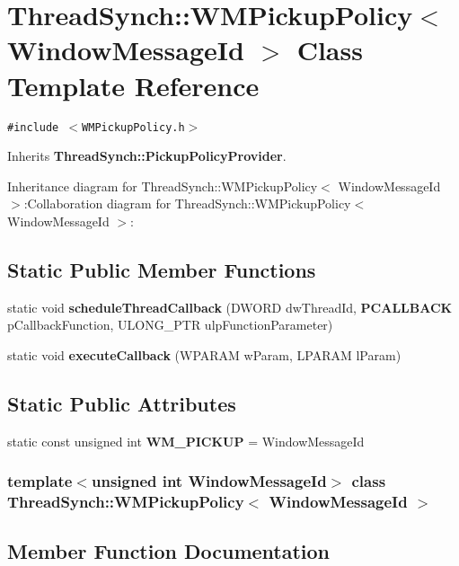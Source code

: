 \section{Thread\-Synch::WMPickup\-Policy$<$ Window\-Message\-Id $>$ Class Template Reference}
\label{class_thread_synch_1_1_w_m_pickup_policy}
{\tt \#include $<$WMPickup\-Policy.h$>$}

Inherits {\bf Thread\-Synch::Pickup\-Policy\-Provider}.

Inheritance diagram for Thread\-Synch::WMPickup\-Policy$<$ Window\-Message\-Id $>$:Collaboration diagram for Thread\-Synch::WMPickup\-Policy$<$ Window\-Message\-Id $>$:\subsection*{Static Public Member Functions}
\begin{CompactItemize}
\item 
static void {\bf schedule\-Thread\-Callback} (DWORD dw\-Thread\-Id, {\bf PCALLBACK} p\-Callback\-Function, ULONG\_\-PTR ulp\-Function\-Parameter)
\item 
static void {\bf execute\-Callback} (WPARAM w\-Param, LPARAM l\-Param)
\end{CompactItemize}
\subsection*{Static Public Attributes}
\begin{CompactItemize}
\item 
static const unsigned int {\bf WM\_\-PICKUP} = Window\-Message\-Id
\end{CompactItemize}
\subsubsection*{template$<$unsigned int Window\-Message\-Id$>$ class Thread\-Synch::WMPickup\-Policy$<$ Window\-Message\-Id $>$}



\subsection{Member Function Documentation}
